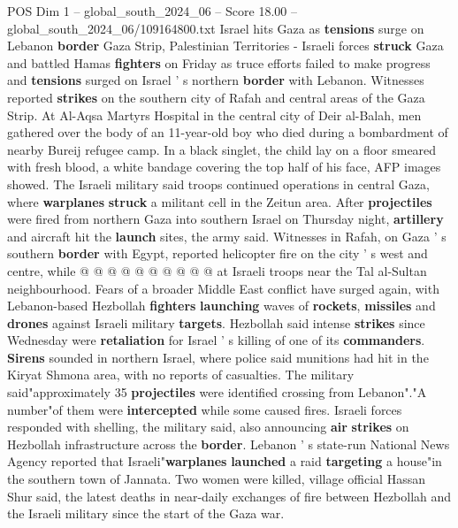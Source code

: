 \begin{textsample}{POS Dim 1 – global\_south\_2024\_06 – Score 18.00 – global\_south\_2024\_06/109164800.txt}  \label{ex:f1_pos_139}
Israel hits Gaza as \textbf{tensions} surge on Lebanon \textbf{border} Gaza Strip, Palestinian Territories - Israeli forces \textbf{struck} Gaza and battled Hamas \textbf{fighters} on Friday as truce efforts failed to make progress and \textbf{tensions} surged on Israel ' s northern \textbf{border} with Lebanon.
Witnesses reported \textbf{strikes} on the southern city of Rafah and central areas of the Gaza Strip.
At Al-Aqsa Martyrs Hospital in the central city of Deir al-Balah, men gathered over the body of an 11-year-old boy who died during a bombardment of nearby Bureij refugee camp.
In a black singlet, the child lay on a floor smeared with fresh blood, a white bandage covering the top half of his face, AFP images showed.
The Israeli military said troops continued operations in central Gaza, where \textbf{warplanes} \textbf{struck} a militant cell in the Zeitun area.
After \textbf{projectiles} were fired from northern Gaza into southern Israel on Thursday night, \textbf{artillery} and aircraft hit the \textbf{launch} sites, the army said.
Witnesses in Rafah, on Gaza ' s southern \textbf{border} with Egypt, reported helicopter fire on the city ' s west and centre, while @ @ @ @ @ @ @ @ @ @ at Israeli troops near the Tal al-Sultan neighbourhood.
Fears of a broader Middle East conflict have surged again, with Lebanon-based Hezbollah \textbf{fighters} \textbf{launching} waves of \textbf{rockets}, \textbf{missiles} and \textbf{drones} against Israeli military \textbf{targets}.
Hezbollah said intense \textbf{strikes} since Wednesday were \textbf{retaliation} for Israel ' s killing of one of its \textbf{commanders}. \textbf{Sirens} sounded in northern Israel, where police said munitions had hit in the Kiryat Shmona area, with no reports of casualties.
The military said"approximately 35 \textbf{projectiles} were identified crossing from Lebanon"."A number"of them were \textbf{intercepted} while some caused fires.
Israeli forces responded with shelling, the military said, also announcing \textbf{air} \textbf{strikes} on Hezbollah infrastructure across the \textbf{border}.
Lebanon ' s state-run National News Agency reported that Israeli"\textbf{warplanes} \textbf{launched} a raid \textbf{targeting} a house"in the southern town of Jannata.
Two women were killed, village official Hassan Shur said, the latest deaths in near-daily exchanges of fire between Hezbollah and the Israeli military since the start of the Gaza war.

\end{textsample}
